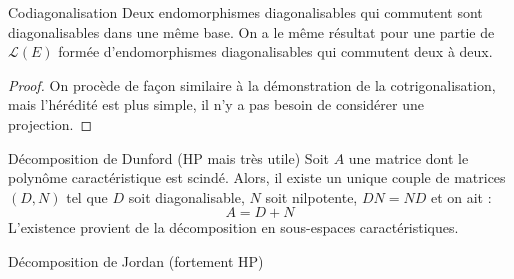 \documentclass[french]{book}
\theoremstyle{plain}
\theoremstyle{definition}
\theoremstyle{remark}
\begin{document}
\begin{AS}{Codiagonalisation} Deux endomorphismes diagonalisables qui commutent sont diagonalisables dans une même base. On a le même résultat pour une partie de $\mathcal{L}(E)$ formée d’endomorphismes diagonalisables qui commutent deux à deux.
\end{AS}
\begin{proof}
On procède de façon similaire à la démonstration de la cotrigonalisation, mais l'hérédité est plus simple, il n'y a pas besoin de considérer une projection.
\end{proof}
\begin{AS}{Décomposition de Dunford (HP mais très utile)} Soit $A$ une matrice dont le polynôme caractéristique est scindé. Alors, il existe un unique couple de matrices $(D,N)$ tel que $D$ soit diagonalisable, $N$ soit nilpotente, $DN=ND$ et on ait : $$A=D+N$$ L'existence provient de la décomposition en sous-espaces caractéristiques.
\end{AS}
\begin{AS}{Décomposition de Jordan (fortement HP)}
\end{AS}
\end{document}

